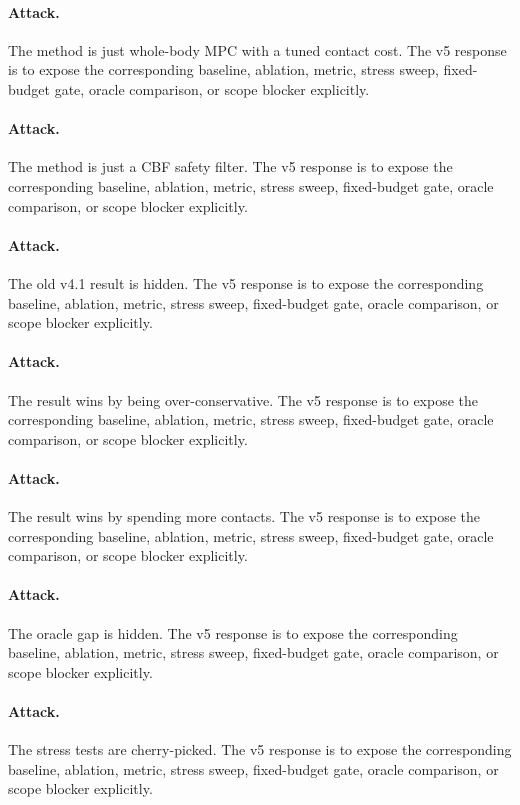 \documentclass{article}
\begin{document}
\paragraph{Attack.} The method is just whole-body MPC with a tuned contact cost. The v5 response is to expose the corresponding baseline, ablation, metric, stress sweep, fixed-budget gate, oracle comparison, or scope blocker explicitly.
\paragraph{Attack.} The method is just a CBF safety filter. The v5 response is to expose the corresponding baseline, ablation, metric, stress sweep, fixed-budget gate, oracle comparison, or scope blocker explicitly.
\paragraph{Attack.} The old v4.1 result is hidden. The v5 response is to expose the corresponding baseline, ablation, metric, stress sweep, fixed-budget gate, oracle comparison, or scope blocker explicitly.
\paragraph{Attack.} The result wins by being over-conservative. The v5 response is to expose the corresponding baseline, ablation, metric, stress sweep, fixed-budget gate, oracle comparison, or scope blocker explicitly.
\paragraph{Attack.} The result wins by spending more contacts. The v5 response is to expose the corresponding baseline, ablation, metric, stress sweep, fixed-budget gate, oracle comparison, or scope blocker explicitly.
\paragraph{Attack.} The oracle gap is hidden. The v5 response is to expose the corresponding baseline, ablation, metric, stress sweep, fixed-budget gate, oracle comparison, or scope blocker explicitly.
\paragraph{Attack.} The stress tests are cherry-picked. The v5 response is to expose the corresponding baseline, ablation, metric, stress sweep, fixed-budget gate, oracle comparison, or scope blocker explicitly.
\end{document}
